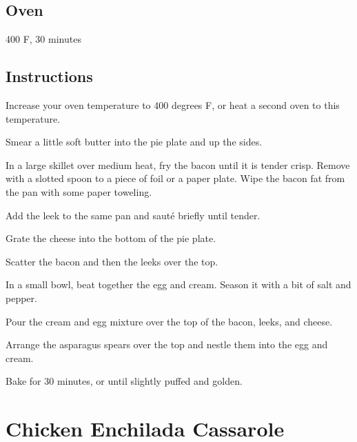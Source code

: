 \documentclass[letterpaper,10pt,english]{sphinxmanual}
\begin{document}
\section{Oven}
\label{\detokenize{Bacon_Leek_Quiche:oven}}
400 F, 30 minutes


\section{Instructions}
\label{\detokenize{Bacon_Leek_Quiche:instructions}}
Increase your oven temperature to 400 degrees F, or heat a second oven to this temperature.

Smear a little soft butter into the pie plate and up the sides.

In a large skillet over medium heat, fry the bacon until it is tender crisp. Remove with a slotted spoon to a piece of foil or a paper plate. Wipe the bacon fat from the pan with some paper toweling.

Add the leek to the same pan and sauté briefly until tender.

Grate the cheese into the bottom of the pie plate.

Scatter the bacon and then the leeks over the top.

In a small bowl, beat together the egg and cream. Season it with a bit of salt and pepper.

Pour the cream and egg mixture over the top of the bacon, leeks, and cheese.

Arrange the asparagus spears over the top and nestle them into the egg and cream.

Bake for 30 minutes, or until slightly puffed and golden.


\chapter{Chicken Enchilada Cassarole}
\label{\detokenize{Chicken_EC:chicken-enchilada-cassarole}}\label{\detokenize{Chicken_EC::doc}}
\end{document}
